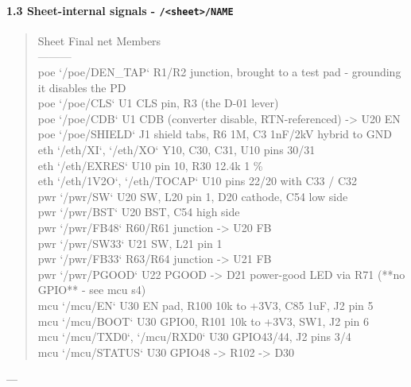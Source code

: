 \documentclass[11pt,a4paper]{article}
\begin{document}
\paragraph*{1.3 Sheet-internal signals - \texttt{/\textless{}sheet\textgreater{}/NAME}}
\begin{quote}\small\ttfamily\raggedright
\textbar{} Sheet \textbar{} Final net \textbar{} Members \textbar{}\\
\textbar{}---\textbar{}---\textbar{}---\textbar{}\\
\textbar{} poe \textbar{} `/poe/DEN\_TAP` \textbar{} R1/R2 junction, brought to a test pad - grounding it disables the PD \textbar{}\\
\textbar{} poe \textbar{} `/poe/CLS` \textbar{} U1 CLS pin, R3 (the D-01 lever) \textbar{}\\
\textbar{} poe \textbar{} `/poe/CDB` \textbar{} U1 CDB (converter disable, RTN-referenced) -\textgreater{} U20 EN \textbar{}\\
\textbar{} poe \textbar{} `/poe/SHIELD` \textbar{} J1 shield tabs, R6 1M, C3 1nF/2kV hybrid to GND \textbar{}\\
\textbar{} eth \textbar{} `/eth/XI`, `/eth/XO` \textbar{} Y10, C30, C31, U10 pins 30/31 \textbar{}\\
\textbar{} eth \textbar{} `/eth/EXRES` \textbar{} U10 pin 10, R30 12.4k 1 \% \textbar{}\\
\textbar{} eth \textbar{} `/eth/1V2O`, `/eth/TOCAP` \textbar{} U10 pins 22/20 with C33 / C32 \textbar{}\\
\textbar{} pwr \textbar{} `/pwr/SW` \textbar{} U20 SW, L20 pin 1, D20 cathode, C54 low side \textbar{}\\
\textbar{} pwr \textbar{} `/pwr/BST` \textbar{} U20 BST, C54 high side \textbar{}\\
\textbar{} pwr \textbar{} `/pwr/FB48` \textbar{} R60/R61 junction -\textgreater{} U20 FB \textbar{}\\
\textbar{} pwr \textbar{} `/pwr/SW33` \textbar{} U21 SW, L21 pin 1 \textbar{}\\
\textbar{} pwr \textbar{} `/pwr/FB33` \textbar{} R63/R64 junction -\textgreater{} U21 FB \textbar{}\\
\textbar{} pwr \textbar{} `/pwr/PGOOD` \textbar{} U22 PGOOD -\textgreater{} D21 power-good LED via R71 ({*}{*}no GPIO{*}{*} - see mcu s4) \textbar{}\\
\textbar{} mcu \textbar{} `/mcu/EN` \textbar{} U30 EN pad, R100 10k to +3V3, C85 1uF, J2 pin 5 \textbar{}\\
\textbar{} mcu \textbar{} `/mcu/BOOT` \textbar{} U30 GPIO0, R101 10k to +3V3, SW1, J2 pin 6 \textbar{}\\
\textbar{} mcu \textbar{} `/mcu/TXD0`, `/mcu/RXD0` \textbar{} U30 GPIO43/44, J2 pins 3/4 \textbar{}\\
\textbar{} mcu \textbar{} `/mcu/STATUS` \textbar{} U30 GPIO48 -\textgreater{} R102 -\textgreater{} D30 \textbar{}
\end{quote}
---
\end{document}
